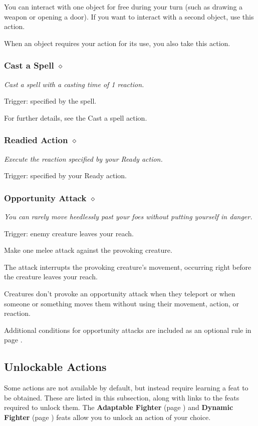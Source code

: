     You can interact with one object for free during your turn (such as drawing a weapon or opening a door).
    If you want to interact with a second object, use this action.

    When an object requires your action for its use, you also take this action.
\subsubsection{Cast a Spell $\diamond$} \label{act::castaspellreact}
    \textit{Cast a spell with a casting time of 1 reaction.}

    Trigger: specified by the spell.

    For further details, see the Cast a spell action.
\subsubsection{Readied Action $\diamond$} \label{act::readiedaction}
    \textit{Execute the reaction specified by your Ready action.}

    Trigger: specified by your Ready action.
\subsubsection{Opportunity Attack $\diamond$} \label{act::opportunityattack}
    \textit{You can rarely move heedlessly past your foes without putting yourself in danger.}

    Trigger: enemy creature leaves your reach.

    Make one melee attack against the provoking creature.

    The attack interrupts the provoking creature's movement, occurring right before the creature leaves your reach.

    Creatures don't provoke an opportunity attack when they teleport or when someone or something moves them without using their movement, action, or reaction.

    Additional conditions for opportunity attacks are included as an optional rule in page \pageref{rule::opportunityattacks}.

\subsection*{Unlockable Actions} \label{ssec::unlockableactions}
    Some actions are not available by default, but instead require learning a feat to be obtained.
    These are listed in this subsection, along with links to the feats required to unlock them.
    The \textbf{Adaptable Fighter} (page \pageref{feat::adaptablefighter}) and \textbf{Dynamic Fighter} (page \pageref{feat::dynamicfighter}) feats allow you to unlock an action of your choice.


